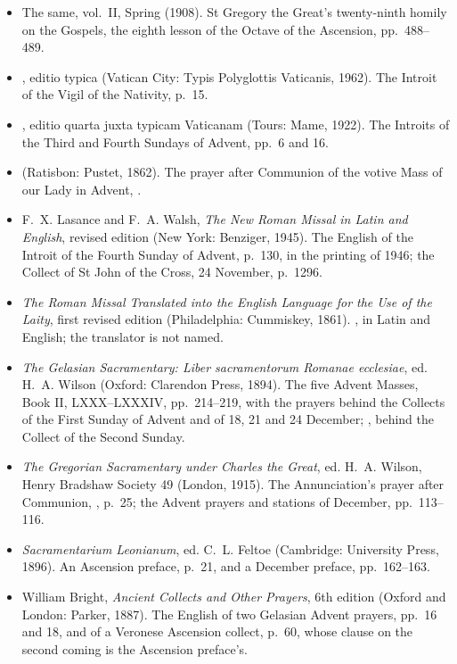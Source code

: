 \begin{itemize}[leftmargin=1.3em, itemsep=0.3em]
Bute prints the Office as it stood before 1960.
\item The same, vol.~II, Spring (1908). St Gregory the Great's twenty-ninth homily on the Gospels,
the eighth lesson of the Octave of the Ascension, pp.~488--489.
\item {}, editio typica (Vatican City: Typis Polyglottis Vaticanis, 1962). The
Introit of the Vigil of the Nativity, p.~15.
\item {}, editio quarta juxta typicam Vaticanam (Tours: Mame, 1922). The
Introits of the Third and Fourth Sundays of Advent, pp.~6 and 16.
\item {} (Ratisbon: Pustet, 1862). The prayer after Communion of the votive
Mass of our Lady in Advent, .
\item F.~X. Lasance and F.~A. Walsh, \textit{The New Roman Missal in Latin and English}, revised
edition (New York: Benziger, 1945). The English of the Introit of the Fourth Sunday of Advent,
p.~130, in the printing of 1946; the Collect of St John of the Cross, 24 November, p.~1296.
\item \textit{The Roman Missal Translated into the English Language for the Use of the Laity}, first
revised edition (Philadelphia: Cummiskey, 1861). , in Latin and
English; the translator is not named.
\item \textit{The Gelasian Sacramentary: Liber sacramentorum Romanae ecclesiae}, ed. H.~A. Wilson
(Oxford: Clarendon Press, 1894). The five Advent Masses, Book II, LXXX--LXXXIV, pp.~214--219,
with the prayers behind the Collects of the First Sunday of Advent and of 18, 21 and 24
December; , behind the Collect of the Second Sunday.
\item \textit{The Gregorian Sacramentary under Charles the Great}, ed. H.~A. Wilson, Henry Bradshaw
Society 49 (London, 1915). The Annunciation's prayer after Communion, , p.~25;
the Advent prayers and stations of December, pp.~113--116.
\item \textit{Sacramentarium Leonianum}, ed. C.~L. Feltoe (Cambridge: University Press, 1896). An
Ascension preface, p.~21, and a December preface, pp.~162--163.
\item William Bright, \textit{Ancient Collects and Other Prayers}, 6th edition (Oxford and London:
Parker, 1887). The English of two Gelasian Advent prayers, pp.~16 and 18, and of a Veronese
Ascension collect, p.~60, whose clause on the second coming is the Ascension preface's.

\end{itemize}
